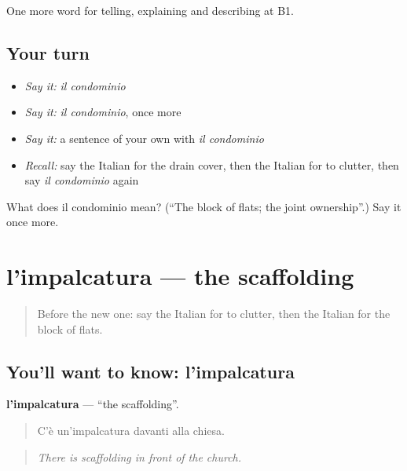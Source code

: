 \begin{grammarlens}[title={What you've built}]
One more word for telling, explaining and describing at B1.
\end{grammarlens}

\subsection*{Your turn}
\begin{itemize}
\raggedright
  \item \emph{Say it:} \emph{il condominio}
  \item \emph{Say it:} \emph{il condominio}, once more
  \item \emph{Say it:} a sentence of your own with \emph{il condominio}
  \item \emph{Recall:} say the Italian for the drain cover, then the Italian for to clutter, then say \emph{il condominio} again
\end{itemize}

\begin{tcolorbox}[breakable,colback=teal!4,colframe=teal!35!black,title={Before you move on}]
What does il condominio mean? (\textquotedblleft{}The block of flats; the joint ownership\textquotedblright{}.) Say it once more.
\end{tcolorbox}
\section[l'impalcatura]{l'impalcatura — the scaffolding}

\label{lesson:IT-C449-impalcatura}



\begin{quote}
Before the new one: say the Italian for to clutter, then the Italian for the block of flats.
\end{quote}

\subsection*{You'll want to know: l'impalcatura}
\textbf{l'impalcatura} — \textquotedblleft{}the scaffolding\textquotedblright{}.

\begin{quote}
C'è un'impalcatura davanti alla chiesa.
\end{quote}

\begin{quote}
\emph{There is scaffolding in front of the church.}
\end{quote}

